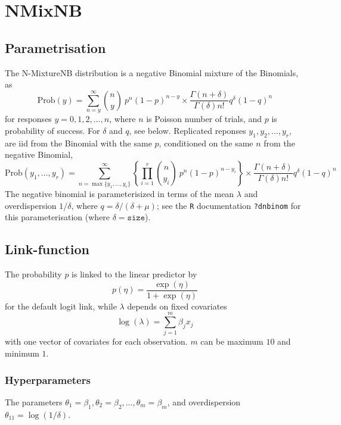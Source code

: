 \documentclass[a4paper,11pt]{article}
\def\mmax{10}
\def\mmaxp1{11}
\begin{document}
\section*{NMixNB}

\subsection*{Parametrisation}

The N-MixtureNB distribution is a negative Binomial mixture of the
Binomials, as
\begin{displaymath}
    \text{Prob}(y) = \sum_{n=y}^{\infty} {n \choose y} \ p^n
    (1-p)^{n-y} \times \frac{\Gamma(n + \delta)}{\Gamma(\delta) n!}
    q^{\delta}(1-q)^{n}
\end{displaymath}
for responses $y=0, 1, 2, \ldots,n$, where $n$ is Poisson number of
trials, and $p$ is probability of success. For $\delta$ and $q$, see
below. Replicated reponses $y_1, y_2, \ldots, y_r$, are iid from the
Binomial with the same $p$, conditioned on the same $n$ from the
negative Binomial,
\begin{displaymath}
    \text{Prob}(y_1, \ldots, y_r) = \sum_{n=\max\{y_1, \ldots,
        y_r\}}^{\infty} \left\{\prod_{i=1}^{r}
      {n \choose y_i} \ p^n
      (1-p)^{n-y_i}\right\} \times \frac{\Gamma(n + \delta)}{\Gamma(\delta) n!}
    q^{\delta}(1-q)^{n}
\end{displaymath}
The negative binomial is parameterisized in terms of the mean
$\lambda$ and overdispersion $1/\delta$, where
$q = \delta/(\delta + \mu)$; see the \texttt{R} documentation
\texttt{?dnbinom} for this parameterisation (where
$\delta=\texttt{size}$).

\subsection*{Link-function}

The probability $p$ is linked to the linear predictor by
\begin{displaymath}
    p(\eta) = \frac{\exp(\eta)}{1+\exp(\eta)}
\end{displaymath}
for the default logit link, while $\lambda$ depends on fixed
covariates
\begin{displaymath}
    \log(\lambda) = \sum_{j=1}^{m} \beta_j x_j
\end{displaymath}
with one vector of covariates for each observation. $m$ can be maximum
$\mmax$ and minimum $1$.

\subsubsection*{Hyperparameters}
The parameters
$\theta_1=\beta_1, \theta_2=\beta_2, \ldots, \theta_m=\beta_m$, and
overdispersion $\theta_{\mmaxp1} = \log(1/\delta)$.
\end{document}

